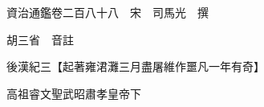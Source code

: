 










 


 
 


 

  
  
  
  
  





  
  
  
  
  
 
  

  

  
  
  



  

 
 

  
   




  

  
  


  　　資治通鑑卷二百八十八　宋　司馬光　撰

　　胡三省　音註

　　後漢紀三【起著雍涒灘三月盡屠維作噩凡一年有奇】

　　高祖睿文聖武昭肅孝皇帝下

